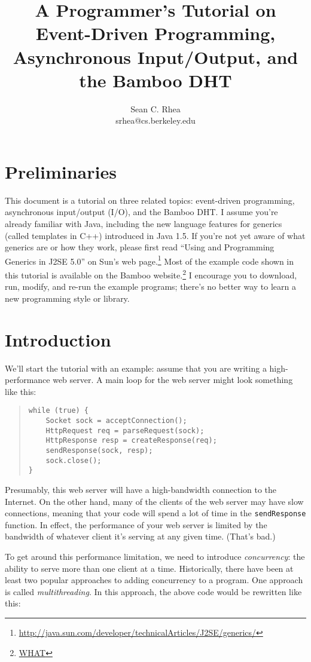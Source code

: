 \documentclass[11pt]{article}
\title{A Programmer's Tutorial on Event-Driven Programming,\\
       Asynchronous Input/Output, and the Bamboo DHT}
\author{Sean C. Rhea\\ srhea@cs.berkeley.edu}
\begin{document}
\maketitle

\section{Preliminaries}

This document is a tutorial on three related topics: event-driven
programming, asynchronous input/output (I/O), and the Bamboo DHT.  I
assume you're already familiar with Java, including the new language
features for generics (called templates in C++) introduced in Java 1.5.
If you're not yet aware of what generics are or how they work, please
first read ``Using and Programming Generics in J2SE 5.0'' on Sun's web
page.\footnote{\url{http://java.sun.com/developer/technicalArticles/J2SE/generics/}}
Most of the example code shown in this tutorial is available on the
Bamboo website.\footnote{\url{WHAT}}  I encourage you to download, run,
modify, and re-run the example programs; there's no better way to learn
a new programming style or library.

\section{Introduction}

We'll start the tutorial with an example: assume that you are writing a
high-performance web server.  A main loop for the web server might look
something like this:

\begin{quote}
\lstset{language=Java, basicstyle=\small}
\begin{lstlisting}  
while (true) {
    Socket sock = acceptConnection();
    HttpRequest req = parseRequest(sock);
    HttpResponse resp = createResponse(req);
    sendResponse(sock, resp);
    sock.close();
}
\end{lstlisting}
\end{quote}

Presumably, this web server will have a high-bandwidth connection to the
Internet.  On the other hand, many of the clients of the web server may
have slow connections, meaning that your code will spend a lot of time
in the \texttt{sendResponse} function.  In effect, the performance of
your web server is limited by the bandwidth of whatever client it's
serving at any given time.  (That's bad.)

To get around this performance limitation, we need to introduce
\emph{concurrency}: the ability to serve more than one client at a time.
Historically, there have been at least two popular approaches to adding
concurrency to a program.  One approach is called \emph{multithreading}.
In this approach, the above code would be rewritten like this:
\end{document}
